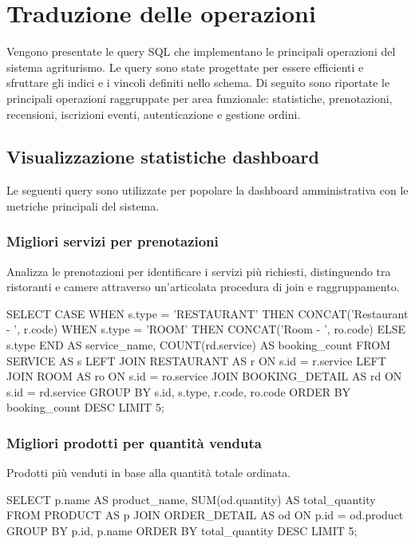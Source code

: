 \documentclass[a4paper,12pt]{report}
\begin{document}
\section{Traduzione delle operazioni}
Vengono presentate le query SQL che implementano le principali
operazioni del sistema agriturismo. Le query sono state progettate
per essere efficienti e sfruttare gli indici e i vincoli definiti
nello schema. Di seguito sono riportate le principali operazioni
raggruppate per area funzionale: statistiche, prenotazioni,
recensioni, iscrizioni eventi, autenticazione e gestione ordini.

\subsection{Visualizzazione statistiche dashboard}
Le seguenti query sono utilizzate per popolare la dashboard
amministrativa con le metriche principali del sistema.

\subsubsection{Migliori servizi per prenotazioni}
Analizza le prenotazioni per identificare i servizi più richiesti,
distinguendo tra ristoranti e camere attraverso un'articolata
procedura di join e raggruppamento.

\begin{sqlcode}[caption={}]
SELECT CASE
    WHEN s.type = 'RESTAURANT' THEN CONCAT('Restaurant - ', r.code)
    WHEN s.type = 'ROOM' THEN CONCAT('Room - ', ro.code)
    ELSE s.type
  END AS service_name,
  COUNT(rd.service) AS booking_count
FROM SERVICE AS s
LEFT JOIN RESTAURANT AS r ON s.id = r.service
LEFT JOIN ROOM AS ro ON s.id = ro.service
JOIN BOOKING_DETAIL AS rd ON s.id = rd.service
GROUP BY s.id, s.type, r.code, ro.code
ORDER BY booking_count DESC
LIMIT 5;
\end{sqlcode}

\subsubsection{Migliori prodotti per quantità venduta}
Prodotti più venduti in base alla quantità totale ordinata.

\begin{sqlcode}[caption={}]
SELECT
  p.name AS product_name,
  SUM(od.quantity) AS total_quantity
FROM PRODUCT AS p
JOIN ORDER_DETAIL AS od ON p.id = od.product
GROUP BY p.id, p.name
ORDER BY total_quantity DESC
LIMIT 5;
\end{sqlcode}
\end{document}
